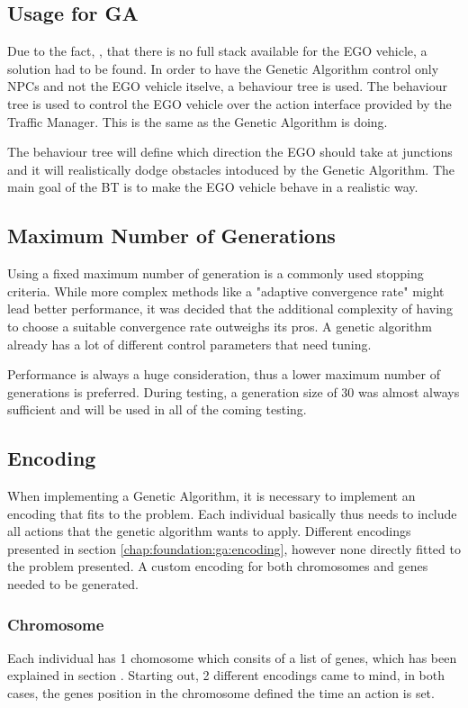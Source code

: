 \subsection{Usage for GA}
Due to the fact, , that there is no full stack available for the EGO vehicle, a solution had to be found.
In order to have the Genetic Algorithm control only NPCs and not the EGO vehicle itselve, a behaviour tree is used.
The behaviour tree is used to control the EGO vehicle over the action interface provided by the Traffic Manager. This is the same as the Genetic Algorithm is doing.

The behaviour tree will define which direction the EGO should take at junctions and it will realistically dodge obstacles intoduced by the Genetic Algorithm. The main goal of the BT is to make the EGO vehicle behave in a realistic way.

\subsection{Maximum Number of Generations}
Using a fixed maximum number of generation is a commonly used stopping criteria. While more complex methods like a "adaptive convergence rate" might lead better performance, it was decided that the additional complexity of having to choose a suitable convergence rate outweighs its pros. A genetic algorithm already has a lot of different control parameters that need tuning.

Performance is always a huge consideration, thus a lower maximum number of generations is preferred. During testing, a generation size of 30 was almost always sufficient and will be used in all of the coming testing.


\subsection{Encoding}
When implementing a Genetic Algorithm, it is necessary to implement an encoding that fits to the problem. Each individual basically thus needs to include all actions that the genetic algorithm wants to apply. Different encodings presented in section \ref{chap:foundation:ga:encoding}, however none directly fitted to the problem presented. A custom encoding for both chromosomes and genes needed to be generated.

\subsubsection{Chromosome}
Each individual has 1 chomosome which consits of a list of genes, which has been explained in section . Starting out, 2 different encodings came to mind, in both cases, the genes position in the chromosome defined the time an action is set.

